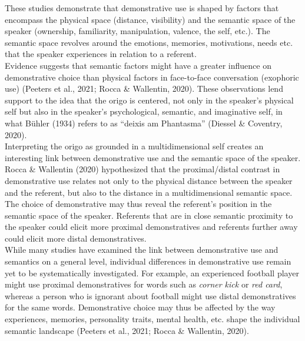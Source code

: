\documentclass[11pt, a4paper]{article}
\begin{document}
These studies demonstrate that demonstrative use is shaped by factors that encompass the physical space (distance, visibility) and the semantic space of the speaker (ownership, familiarity, manipulation, valence, the self, etc.). The semantic space revolves around the emotions, memories, motivations, needs etc. that the speaker experiences in relation to a referent.\\
Evidence suggests that semantic factors might have a greater influence on demonstrative choice than physical factors in face-to-face conversation (exophoric use) (Peeters et al., 2021; Rocca \& Wallentin, 2020). These observations lend support to the idea that the origo is centered, not only in the speaker’s physical self but also in the speaker’s psychological, semantic, and imaginative self, in what Bühler (1934) refers to as “deixis am Phantasma” (Diessel \& Coventry, 2020). \\

Interpreting the origo as grounded in a multidimensional self creates an interesting link between demonstrative use and the semantic space of the speaker. Rocca \& Wallentin (2020) hypothesized that the proximal/distal contrast in demonstrative use relates not only to the physical distance between the speaker and the referent, but also to the distance in a multidimensional semantic space. The choice of demonstrative may thus reveal the referent’s position in the semantic space of the speaker. Referents that are in close semantic proximity to the speaker could elicit more proximal demonstratives and referents further away could elicit more distal demonstratives. \\

While many studies have examined the link between demonstrative use and semantics on a general level, individual differences in demonstrative use remain yet to be systematically investigated. For example, an experienced football player might use proximal demonstratives for words such as \textit{corner kick} or \textit{red card}, whereas a person who is ignorant about football might use distal demonstratives for the same words. Demonstrative choice may thus be affected by the way experiences, memories, personality traits, mental health, etc. shape the individual semantic landscape (Peeters et al., 2021; Rocca & Wallentin, 2020). 
\end{document}
